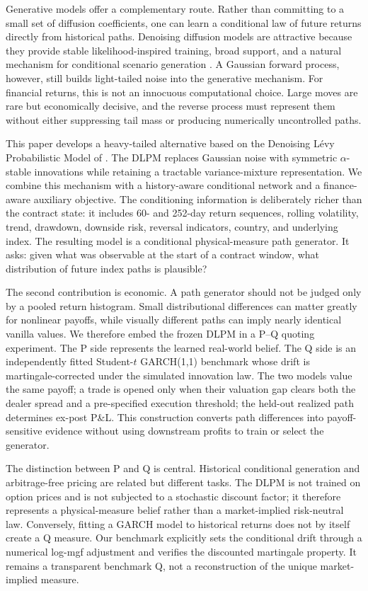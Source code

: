 ﻿\documentclass[12pt,letterpaper]{article}
\begin{document}
Generative models offer a complementary route. Rather than committing to a
small set of diffusion coefficients, one can learn a conditional law of future
returns directly from historical paths. Denoising diffusion models are
attractive because they provide stable likelihood-inspired training, broad
support, and a natural mechanism for conditional scenario generation
\citep{ho2020ddpm,rasul2021timegrad}. A Gaussian forward process, however,
still builds light-tailed noise into the generative mechanism. For financial
returns, this is not an innocuous computational choice. Large moves are rare
but economically decisive, and the reverse process must represent them without
either suppressing tail mass or producing numerically uncontrolled paths.

This paper develops a heavy-tailed alternative based on the Denoising L\'evy
Probabilistic Model of \citet{shariatian2024dlpm}. The DLPM replaces Gaussian noise
with symmetric $\alpha$-stable innovations while retaining a tractable
variance-mixture representation. We combine this mechanism with a
history-aware conditional network and a finance-aware auxiliary objective.
The conditioning information is deliberately richer than the contract state:
it includes 60- and 252-day return sequences, rolling volatility, trend,
drawdown, downside risk, reversal indicators, country, and underlying index.
The resulting model is a conditional physical-measure path generator. It asks:
given what was observable at the start of a contract window, what distribution
of future index paths is plausible?

The second contribution is economic. A path generator should not be judged
only by a pooled return histogram. Small distributional differences can matter
greatly for nonlinear payoffs, while visually different paths can imply nearly
identical vanilla values. We therefore embed the frozen DLPM in a P--Q quoting
experiment. The P side represents the learned real-world belief. The Q side is
an independently fitted Student-$t$ GARCH(1,1) benchmark whose drift is
martingale-corrected under the simulated innovation law. The two models value
the same payoff; a trade is opened only when their valuation gap clears both
the dealer spread and a pre-specified execution threshold; the held-out
realized path determines ex-post P\&L. This construction converts path
differences into payoff-sensitive evidence without using downstream profits to
train or select the generator.

The distinction between P and Q is central. Historical conditional generation
and arbitrage-free pricing are related but different tasks. The DLPM is not
trained on option prices and is not subjected to a stochastic discount factor;
it therefore represents a physical-measure belief rather than a market-implied
risk-neutral law. Conversely, fitting a GARCH model to historical returns does
not by itself create a Q measure. Our benchmark explicitly sets the conditional
drift through a numerical log-mgf adjustment and verifies the discounted
martingale property. It remains a transparent benchmark Q, not a reconstruction
of the unique market-implied measure.
\end{document}
